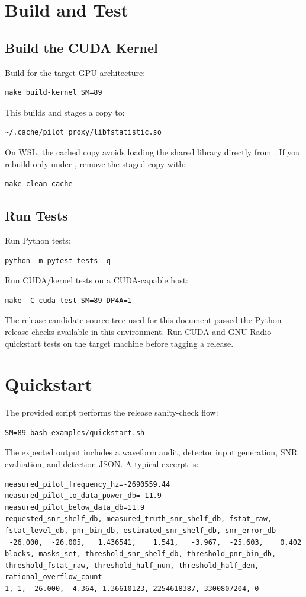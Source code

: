 \documentclass[10pt,letterpaper]{article}
\newcommand{\code}[1]{\texttt{\detokenize{#1}}}
\begin{document}
\section{Build and Test}

\subsection{Build the CUDA Kernel}

Build for the target GPU architecture:
\begin{lstlisting}[style=shell]
make build-kernel SM=89
\end{lstlisting}
This builds \code{cuda/libfstatistic.so} and stages a copy to:
\begin{lstlisting}[style=shell]
~/.cache/pilot_proxy/libfstatistic.so
\end{lstlisting}
On WSL, the cached copy avoids loading the shared library directly from \code{/mnt/c}.  If you rebuild only under \code{cuda/}, remove the staged copy with:
\begin{lstlisting}[style=shell]
make clean-cache
\end{lstlisting}

\subsection{Run Tests}

Run Python tests:
\begin{lstlisting}[style=shell]
python -m pytest tests -q
\end{lstlisting}
Run CUDA/kernel tests on a CUDA-capable host:
\begin{lstlisting}[style=shell]
make -C cuda test SM=89 DP4A=1
\end{lstlisting}
The release-candidate source tree used for this document passed the Python release checks available in this environment.  Run CUDA and GNU Radio quickstart tests on the target machine before tagging a release.

\section{Quickstart}

The provided script performs the release sanity-check flow:
\begin{lstlisting}[style=shell]
SM=89 bash examples/quickstart.sh
\end{lstlisting}
The expected output includes a waveform audit, detector input generation, SNR evaluation, and detection JSON.  A typical excerpt is:
\begin{lstlisting}[style=shell]
measured_pilot_frequency_hz=-2690559.44
measured_pilot_to_data_power_db=-11.9
measured_pilot_below_data_db=11.9
requested_snr_shelf_db, measured_truth_snr_shelf_db, fstat_raw, fstat_level_db, pnr_bin_db, estimated_snr_shelf_db, snr_error_db
 -26.000,  -26.005,   1.436541,    1.541,   -3.967,  -25.603,    0.402
blocks, masks_set, threshold_snr_shelf_db, threshold_pnr_bin_db, threshold_fstat_raw, threshold_half_num, threshold_half_den, rational_overflow_count
1, 1, -26.000, -4.364, 1.36610123, 2254618387, 3300807204, 0
\end{lstlisting}
\end{document}
